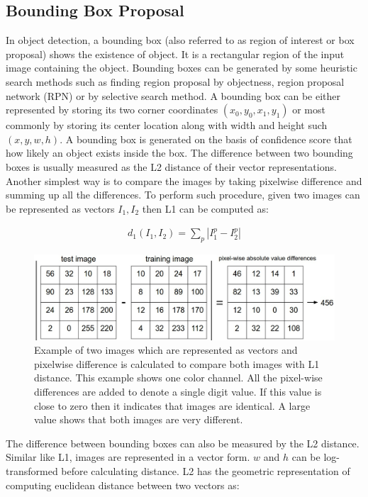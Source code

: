 \documentclass[11pt]{article}
\begin{document}
\subsection{Bounding Box Proposal}
In object detection, a bounding box (also referred to as region of interest or box proposal) shows the existence of object. It is a rectangular region of the input image containing the object. Bounding boxes can be generated by some heuristic search methods such as finding region proposal by objectness, region proposal network (RPN) or by selective search method. A bounding box can be either represented by storing its two corner coordinates $(x_0, y_0, x_1, y_1 )$  or most commonly by storing its center location along  with width and height such $(x, y, w, h)$. A bounding box is generated on the basis of confidence score that how likely an object exists inside the box. The difference between two bounding boxes is usually measured as the L2 distance of their vector representations. Another simplest way is to compare the images by taking pixelwise difference and summing up all the differences. To perform such procedure, given two images can be represented as vectors $I_1, I_2$ then L1 can be computed as:

\begin{align*}
d_1 (I_1, I_2) = \sum_{p} \left| I^p_1 - I^p_2 \right|
\end{align*}

\begin{figure}[ht!]
	\centering
	\includegraphics[width=.6\linewidth]{files/nneg.jpeg}
	\caption{Example of two images which are represented as vectors and pixelwise difference is calculated to compare both images with L1 distance. This example shows one color channel. All the pixel-wise differences are added to denote a single digit value. If this value is close to zero then it indicates that images are identical. A large value shows that both images are very different.}
	\label{fig: bbp.}
\end{figure}

The difference between bounding boxes can also be measured by the L2 distance. Similar like L1, images are represented in a vector form. $w$ and $h$ can be log-transformed before calculating distance. L2 has the geometric representation of computing euclidean distance between two vectors as:
\end{document}
